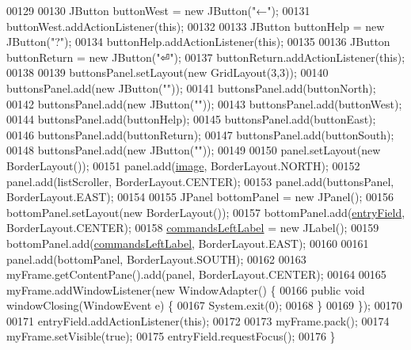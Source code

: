 \begin{DoxyCode}
00129 
00130         JButton buttonWest = \textcolor{keyword}{new} JButton(\textcolor{stringliteral}{"←"});
00131         buttonWest.addActionListener(\textcolor{keyword}{this});
00132 
00133         JButton buttonHelp = \textcolor{keyword}{new} JButton(\textcolor{stringliteral}{"?"});
00134         buttonHelp.addActionListener(\textcolor{keyword}{this});
00135 
00136         JButton buttonReturn = \textcolor{keyword}{new} JButton(\textcolor{stringliteral}{"⏎"});
00137         buttonReturn.addActionListener(\textcolor{keyword}{this});
00138 
00139         buttonsPanel.setLayout(\textcolor{keyword}{new} GridLayout(3,3));
00140         buttonsPanel.add(\textcolor{keyword}{new} JButton(\textcolor{stringliteral}{""}));
00141         buttonsPanel.add(buttonNorth);
00142         buttonsPanel.add(\textcolor{keyword}{new} JButton(\textcolor{stringliteral}{""}));
00143         buttonsPanel.add(buttonWest);
00144         buttonsPanel.add(buttonHelp);
00145         buttonsPanel.add(buttonEast);
00146         buttonsPanel.add(buttonReturn);
00147         buttonsPanel.add(buttonSouth);
00148         buttonsPanel.add(\textcolor{keyword}{new} JButton(\textcolor{stringliteral}{""}));
00149 
00150         panel.setLayout(\textcolor{keyword}{new} BorderLayout());
00151         panel.add(\hyperlink{classUserInterface_a0d115eb19b54f3e002ec6aa0fcfb1db4}{image}, BorderLayout.NORTH);
00152         panel.add(listScroller, BorderLayout.CENTER);
00153         panel.add(buttonsPanel, BorderLayout.EAST);
00154 
00155         JPanel bottomPanel = \textcolor{keyword}{new} JPanel();
00156         bottomPanel.setLayout(\textcolor{keyword}{new} BorderLayout());
00157         bottomPanel.add(\hyperlink{classUserInterface_a940367d996e9e7ad6e1fa1abfe35128b}{entryField}, BorderLayout.CENTER);
00158         \hyperlink{classUserInterface_a88813d21f37fc65c1afae2250acd06d0}{commandsLeftLabel} = \textcolor{keyword}{new} JLabel();
00159         bottomPanel.add(\hyperlink{classUserInterface_a88813d21f37fc65c1afae2250acd06d0}{commandsLeftLabel}, BorderLayout.EAST);
00160 
00161         panel.add(bottomPanel, BorderLayout.SOUTH);
00162 
00163         myFrame.getContentPane().add(panel, BorderLayout.CENTER);
00164 
00165         myFrame.addWindowListener(\textcolor{keyword}{new} WindowAdapter() \{
00166             \textcolor{keyword}{public} \textcolor{keywordtype}{void} windowClosing(WindowEvent e) \{
00167                 System.exit(0);
00168             \}
00169         \});
00170 
00171         entryField.addActionListener(\textcolor{keyword}{this});
00172 
00173         myFrame.pack();
00174         myFrame.setVisible(\textcolor{keyword}{true});
00175         entryField.requestFocus();
00176     \}
\end{DoxyCode}


